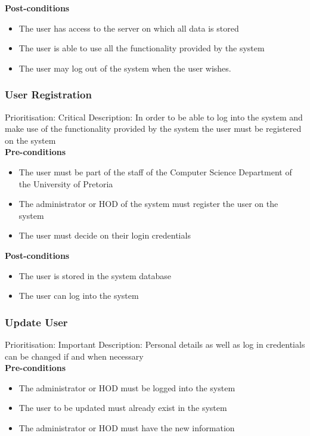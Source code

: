 \documentclass[a4paper]{article}
\begin{document}
    \textbf{Post-conditions}
     \begin{itemize}
        \item The user has access to the server on which all data is stored
        \item The user is able to use all the functionality provided by the system 
        \item The user may log out of the system when the user wishes.
    \end{itemize}
    
    \subsubsection{User Registration}
    Prioritisation: Critical
    Description:  In order to be able to log into the system and make use of the functionality provided by the system the user must be registered on the system \\
    
    \textbf{Pre-conditions}
     \begin{itemize}
        \item The user must be part of the staff of the Computer Science Department of the University of Pretoria
        \item The administrator or HOD of the system must register the user on the system
        \item The user must decide on their login credentials
   \end{itemize}
    
    \textbf{Post-conditions}
    \begin{itemize}
        \item The user is stored in the system database
        \item The user can log into the system
    \end{itemize}
    
    \subsubsection{Update User}
    Prioritisation: Important
    Description: Personal details as well as log in credentials can be changed if and when necessary\\
    
    \textbf{Pre-conditions}
     \begin{itemize}
        \item The administrator or HOD must be logged into the system
        \item The user to be updated must already exist in the system
        \item The administrator or HOD must have the new information
   \end{itemize}
    
\end{document}
